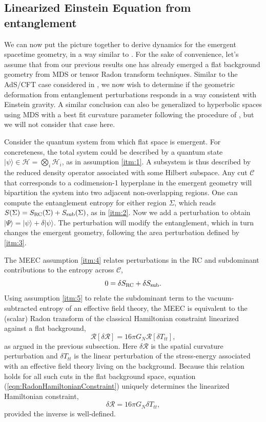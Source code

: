 \documentclass[%
12pt,preprint,
nofootinbib,
amsmath,amssymb,
aps,
prd,
showpacs,
superscriptaddress
]{revtex4-2}
\newcommand{\R}{\mathscr{R}}
\begin{document}
\subsection{Linearized Einstein Equation from entanglement}

We can now put the picture together to derive dynamics for the emergent spacetime geometry, in a way similar to \cite{Jacobson:2015hqa}.
For the sake of convenience, let's assume that from our previous results one has already emerged a flat background geometry from MDS or tensor Radon transform techniques. Similar to the AdS/CFT case considered in \cite{Faulkner:2013ica}, we now wish to determine if the geometric deformation from entanglement perturbations responds in a way consistent with Einstein gravity. 
A similar conclusion can also be generalized to hyperbolic spaces using MDS with a best fit curvature parameter following the procedure of \cite{Czech:2016tqr}, but we will not consider that case here. 

Consider the quantum system from which flat space is emergent. For concreteness, the total system could be described by a quantum state $|\psi\rangle\in\mathcal{H} = \bigotimes_i \mathcal{H}_i$, as in assumption \ref{itm:1}. A subsystem is thus described by the reduced density operator associated with some Hilbert subspace. Any cut $\mathcal{C}$ that corresponds to a codimension-1 hyperplane in the emergent geometry will bipartition the system into two adjacent non-overlapping regions. One can compute the entanglement entropy for either region $\Sigma$, which reads $S(\Sigma) = S_{\rm RC}(\Sigma) +S_{\rm sub}(\Sigma)$, as in \ref{itm:2}. Now we add a perturbation to obtain $|\Psi\rangle = |\psi\rangle + \delta |\psi\rangle$. The perturbation will modify the entanglement, which in turn changes the emergent geometry, following the area perturbation defined by \ref{itm:3}. 
 
The MEEC assumption \ref{itm:4} relates perturbations in the RC and subdominant contributions to the entropy across $\mathcal{C}$,
\begin{equation}
 0=\delta S_{\rm RC}+\delta S_{\rm sub}.
\end{equation}
Using assumption \ref{itm:5} to relate the subdominant term to the vacuum-subtracted entropy of an effective field theory, the MEEC is equivalent to the (scalar) Radon transform of the classical Hamiltonian constraint linearized against a flat background, 
\begin{equation}
\R[\delta \mathcal{R}]= 16\pi G_N \R[\delta T_{tt}],
\label{eqn:RadonHamiltonianConstraint}
\end{equation}
as argued in the previous subsection.
Here $\delta \mathcal{R}$ is the spatial curvature perturbation and $\delta T_{tt}$ is the linear perturbation of the stress-energy associated with an effective field theory living on the background. 
Because this relation holds for all such cuts in the flat background space, equation (\ref{eqn:RadonHamiltonianConstraint}) uniquely determines the linearized Hamiltonian constraint,
\begin{equation}
\delta\mathcal{R}= 16\pi G_N\delta T_{tt},
\label{eqn:HamiltonianConstraint}
\end{equation}
provided the inverse is well-defined. 
\end{document}
